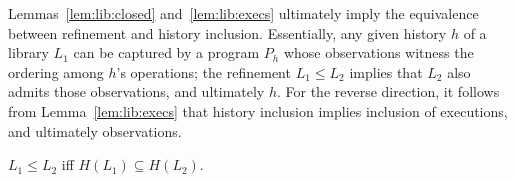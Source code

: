 %
%

Lemmas~\ref{lem:lib:closed} and~\ref{lem:lib:execs} ultimately imply the
equivalence between refinement and history inclusion. Essentially, any given
history $h$ of a library $L_1$ can be captured by a program $P_h$ whose
observations witness the ordering among $h$'s operations; the refinement $L_1
\leq L_2$ implies that $L_2$ also admits those observations, and ultimately
$h$. For the reverse direction, it follows from Lemma~\ref{lem:lib:execs} that
history inclusion implies inclusion of executions, and ultimately observations.

\begin{theorem}
  \label{thm:equivalence}

  $L_1 \leq L_2$ if{f} $H(L_1) \subseteq H(L_2)$.

\end{theorem}

